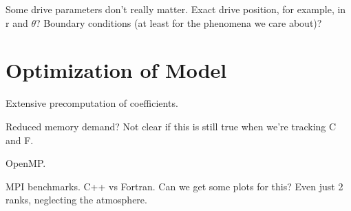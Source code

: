 Some drive parameters don't really matter. Exact drive position, for example, in r and $\theta$? Boundary conditions (at least for the phenomena we care about)?



\section{Optimization of Model}

Extensive precomputation of coefficients. 

Reduced memory demand? Not clear if this is still true when we're tracking C and F. 

OpenMP. 

MPI benchmarks. C++ vs Fortran. Can we get some plots for this? Even just 2 ranks, neglecting the atmosphere. 













